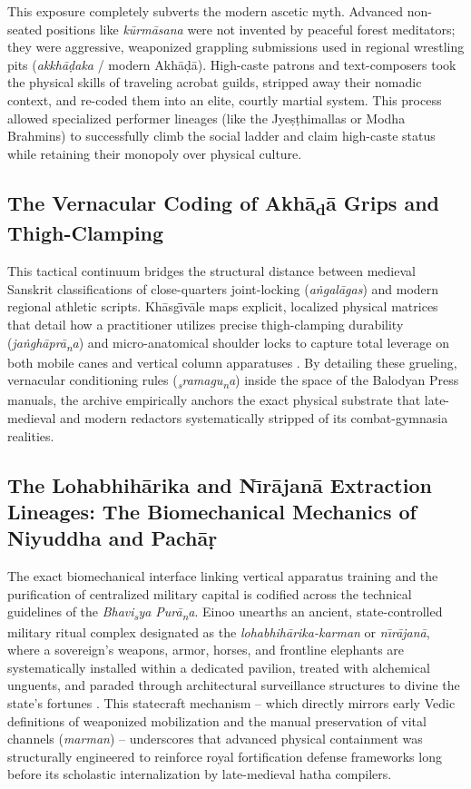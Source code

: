 \documentclass[11pt,twoside,letterpaper]{article}
\begin{document}
This exposure completely subverts the modern ascetic myth. Advanced non-seated positions like \textit{kūrmāsana} were not invented by peaceful forest meditators; they were aggressive, weaponized grappling submissions used in regional wrestling pits (\textit{akkhāḍaka} / modern Akhāḍā). High-caste patrons and text-composers took the physical skills of traveling acrobat guilds, stripped away their nomadic context, and re-coded them into an elite, courtly martial system. This process allowed specialized performer lineages (like the Jyeṣṭhimallas or Modha Brahmins) to successfully climb the social ladder and claim high-caste status while retaining their monopoly over physical culture.

\subsection{The Vernacular Coding of Akh\={a}\textsubscript{d}\={a} Grips and Thigh-Clamping}
This tactical continuum bridges the structural distance between medieval Sanskrit classifications of close-quarters joint-locking (\textit{a\.{n}gal\={a}gas}) and modern regional athletic scripts. Kh\={a}sg\={\={\i}}v\={a}le maps explicit, localized physical matrices that detail how a practitioner utilizes precise thigh-clamping durability (\textit{ja\.{n}gh\={a}pr\={a}\textsubscript{n}a}) and micro-anatomical shoulder locks to capture total leverage on both mobile canes and vertical column apparatuses \cite{Khasgivale1929}. By detailing these grueling, vernacular conditioning rules (\textit{\textsubscript{s}ramagu\textsubscript{n}a}) inside the space of the Balodyan Press manuals, the archive empirically anchors the exact physical substrate that late-medieval and modern redactors systematically stripped of its combat-gymnasia realities.

\subsection{The Lohabhih\={a}rika and N\={\i}r\={a}jan\={a} Extraction Lineages: The Biomechanical Mechanics of Niyuddha and Pachāṛ}
The exact biomechanical interface linking vertical apparatus training and the purification of centralized military capital is codified across the technical guidelines of the \textit{Bhavi\textsubscript{s}ya Pur\={a}\textsubscript{n}a}. Einoo unearths an ancient, state-controlled military ritual complex designated as the \textit{lohabhih\={a}rika-karman} or \textit{n\={\i}r\={a}jan\={a}}, where a sovereign’s weapons, armor, horses, and frontline elephants are systematically installed within a dedicated pavilion, treated with alchemical unguents, and paraded through architectural surveillance structures to divine the state's fortunes \cite{Einoo1999}. This statecraft mechanism -- which directly mirrors early Vedic definitions of weaponized mobilization and the manual preservation of vital channels (\textit{marman}) -- underscores that advanced physical containment was structurally engineered to reinforce royal fortification defense frameworks long before its scholastic internalization by late-medieval hatha compilers.
\end{document}
